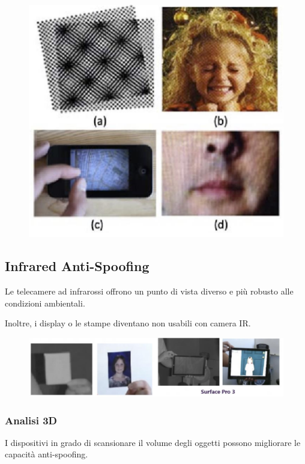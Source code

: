 \documentclass{report}
\begin{document}
\begin{figure}[ht]
    \centering
    \includegraphics[width=0.6\linewidth]{images/pattern.png}
\end{figure}

\subsection{Infrared Anti-Spoofing}
Le telecamere ad infrarossi offrono un punto di vista diverso 
e più robusto alle condizioni ambientali.

\noindent Inoltre, i display o le stampe diventano non usabili 
con camera IR.

\begin{figure}[ht]
    \centering
    \includegraphics[width=1\linewidth]{images/infrared.png}
\end{figure}

\subsubsection{Analisi 3D}
I dispositivi in grado di scansionare il volume degli oggetti 
possono migliorare le capacità anti-spoofing.
\end{document}
